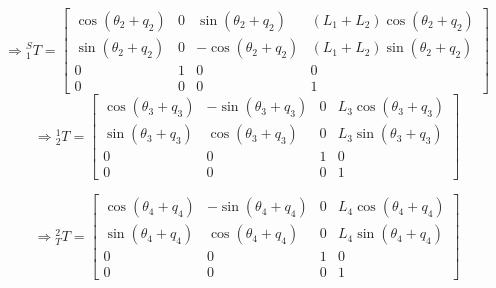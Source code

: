 \documentclass[a4paper]{article}
\begin{document}
\begin{qalist}
			
			\begin{equation}
				\Rightarrow {}^{S}_{1}T = 
				\begin{bmatrix}
					\cos({\theta}_{2} + {q}_{2}) & 0 & \sin({\theta}_{2} + {q}_{2}) & ({L}_{1} + {L}_{2})\cos({\theta}_{2} + {q}_{2}) \\
					\sin({\theta}_{2} + {q}_{2}) & 0 & -\cos({\theta}_{2} + {q}_{2}) & ({L}_{1} + {L}_{2})\sin({\theta}_{2} + {q}_{2}) \\
					0 & 1 & 0 & 0 \\
					0 & 0 & 0 & 1
				\end{bmatrix}
			\end{equation}
			\begin{equation}
				\Rightarrow {}^{1}_{2}T = 
				\begin{bmatrix}
					\cos({\theta}_{3} + {q}_{3}) & -\sin({\theta}_{3} + {q}_{3}) & 0 & {L}_{3}\cos({\theta}_{3} + {q}_{3}) \\
					\sin({\theta}_{3} + {q}_{3}) & \cos({\theta}_{3} + {q}_{3}) & 0 & {L}_{3}\sin({\theta}_{3} + {q}_{3}) \\
					0 & 0 & 1 & 0 \\
					0 & 0 & 0 & 1
				\end{bmatrix}
			\end{equation}
			
			\begin{equation}
				\Rightarrow {}^{2}_{T}T = 
				\begin{bmatrix}
					\cos({\theta}_{4} + {q}_{4}) & -\sin({\theta}_{4} + {q}_{4}) & 0 & {L}_{4}\cos({\theta}_{4} + {q}_{4}) \\
					\sin({\theta}_{4} + {q}_{4}) & \cos({\theta}_{4} + {q}_{4}) & 0 & {L}_{4}\sin({\theta}_{4} + {q}_{4}) \\
					0 & 0 & 1 & 0 \\
					0 & 0 & 0 & 1
				\end{bmatrix}
			\end{equation}
		

\end{qalist}
\end{document}
